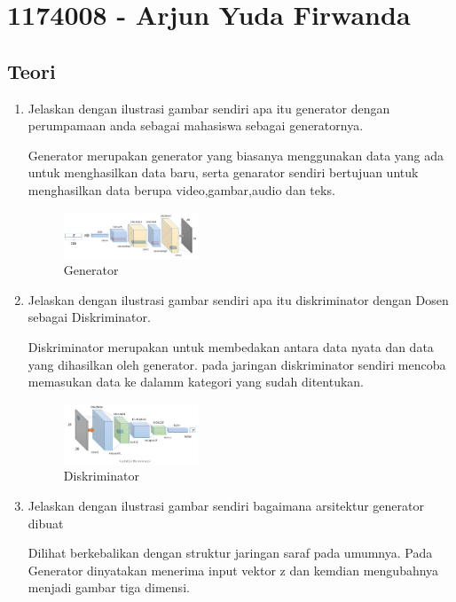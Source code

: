 \section{1174008 - Arjun Yuda Firwanda}

\subsection{Teori}
\begin{enumerate}

        \item Jelaskan dengan ilustrasi gambar sendiri apa itu generator dengan perumpamaan anda sebagai mahasiswa sebagai generatornya.

Generator merupakan generator yang biasanya menggunakan data yang ada untuk menghasilkan data baru, serta genarator sendiri bertujuan untuk menghasilkan data berupa video,gambar,audio dan teks.

	\begin{figure}[H]
            	\includegraphics[width=4cm]{figures/1174008/8/teori1.PNG}
           	 \centering
           	 \caption{Generator}
        	\end{figure}

        \item Jelaskan dengan ilustrasi gambar sendiri apa itu diskriminator dengan Dosen sebagai Diskriminator.

Diskriminator merupakan untuk membedakan antara data nyata dan data yang dihasilkan oleh generator. pada jaringan diskriminator sendiri mencoba memasukan data ke dalamm kategori yang sudah ditentukan.

	\begin{figure}[H]
		\includegraphics[width=4cm]{figures/1174008/8/teori2.PNG}
            	\centering
           	 \caption{Diskriminator}
       	 \end{figure}

        \item Jelaskan dengan ilustrasi gambar sendiri bagaimana arsitektur generator dibuat

Dilihat berkebalikan dengan struktur jaringan saraf pada umumnya. Pada Generator dinyatakan menerima input vektor z dan kemdian mengubahnya menjadi gambar tiga dimensi.


\end{enumerate}
